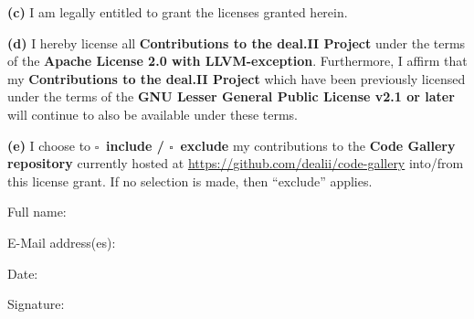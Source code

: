 \documentclass[oneside, 12pt, letterpaper]{article}
\begin{document}
{\bfseries (c)} I am legally entitled to grant the licenses granted herein.

{\bfseries (d)} I hereby license all {\bfseries Contributions to the
deal.II Project} under the terms of the {\bfseries Apache License 2.0 with
LLVM-exception}. Furthermore, I affirm that my {\bfseries Contributions to
the deal.II Project} which have been previously licensed under the terms of
the {\bfseries GNU Lesser General Public License v2.1 or later} will
continue to also be available under these terms.

{\bfseries (e)} I choose to {\bfseries $\square$\, include /
$\square$\, exclude} my contributions to the {\bfseries Code Gallery
repository} currently hosted at
\url{https://github.com/dealii/code-gallery} into/from this license grant.
If no selection is made, then ``exclude'' applies.
\vspace{0.5em}

Full name:
\vspace{0.5em}

E-Mail address(es):
\vspace{2.75em}

Date:
\vspace{0.5em}

Signature:
\end{document}
